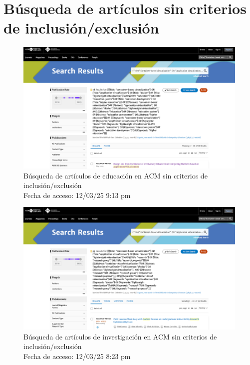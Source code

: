 \section{Búsqueda de artículos sin criterios de inclusión/exclusión}

\begin{figure}[H]
	\centering
	\includegraphics[width=\textwidth,keepaspectratio]{apendices/BD/sin-criterios/ACM-ed.png}
	\caption{Búsqueda de artículos de educación en ACM sin criterios de inclusión/exclusión \\
		Fecha de acceso: 12/03/25 9:13 pm
	}\label{fig:busqueda1}
\end{figure}
\FloatBarrier\begin{figure}[H]
	\centering
	\includegraphics[width=\textwidth,keepaspectratio]{apendices/BD/sin-criterios/ACM-inv.png}
	\caption{Búsqueda de artículos de investigación en ACM sin criterios de inclusión/exclusión \\
		Fecha de acceso: 12/03/25 8:23 pm
	}\label{fig:busqueda2}
\end{figure}
